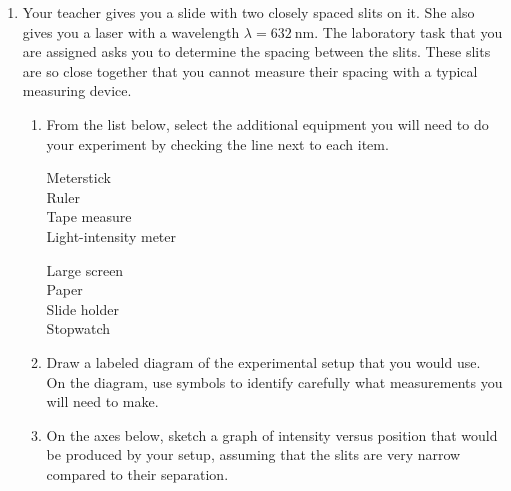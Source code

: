\documentclass{../../../oss-apphys}
\begin{document}
\begin{enumerate}[leftmargin=15pt]
\item Your teacher gives you a slide with two closely spaced slits on it. She
  also gives you a laser with a wavelength $\lambda=\SI{632}{\nano\metre}$. The
  laboratory task that you are assigned asks you to determine the spacing
  between the slits. These slits are so close together that you cannot measure
  their spacing with a typical measuring device.
  \begin{enumerate}[noitemsep]
  \item From the list below, select the additional equipment you will need to
    do your experiment by checking the line next to each item.
    \begin{multicols}{3}
      \underline{\hspace{.3in}} Meterstick\\
      \underline{\hspace{.3in}} Ruler\\
      \underline{\hspace{.3in}} Tape measure\\
      \underline{\hspace{.3in}} Light-intensity meter\\
      \columnbreak
      
      \underline{\hspace{.3in}} Large screen\\
      \underline{\hspace{.3in}} Paper\\
      \underline{\hspace{.3in}} Slide holder\\
      \underline{\hspace{.3in}} Stopwatch
    \end{multicols}
  \item Draw a labeled diagram of the experimental setup that you would use. On
    the diagram, use symbols to identify carefully what measurements you will
    need to make.
    \begin{center}
    \end{center}
  \item On the axes below, sketch a graph of intensity versus position that
    would be produced by your setup, assuming that the slits are very narrow
    compared to their separation.
  \end{enumerate}
  \vspace{2in}
  

\end{enumerate}
\end{document}
